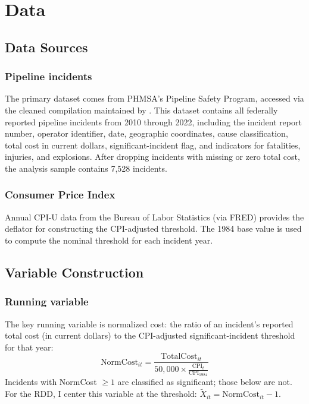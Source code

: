 \documentclass[12pt]{article}
\begin{document}
\section{Data}
\label{sec:data}

\subsection{Data Sources}

\subsubsection*{Pipeline incidents} The primary dataset comes from PHMSA's Pipeline Safety Program, accessed via the cleaned compilation maintained by \citet{mcEager2024phmsa}. This dataset contains all federally reported pipeline incidents from 2010 through 2022, including the incident report number, operator identifier, date, geographic coordinates, cause classification, total cost in current dollars, significant-incident flag, and indicators for fatalities, injuries, and explosions. After dropping incidents with missing or zero total cost, the analysis sample contains 7,528 incidents.

\subsubsection*{Consumer Price Index} Annual CPI-U data from the Bureau of Labor Statistics (via FRED) provides the deflator for constructing the CPI-adjusted threshold. The 1984 base value is used to compute the nominal threshold for each incident year.

\subsection{Variable Construction}

\subsubsection*{Running variable} The key running variable is normalized cost: the ratio of an incident's reported total cost (in current dollars) to the CPI-adjusted significant-incident threshold for that year:
\begin{equation}
\text{NormCost}_{it} = \frac{\text{TotalCost}_{it}}{50{,}000 \times \frac{\text{CPI}_t}{\text{CPI}_{1984}}}
\end{equation}
Incidents with NormCost $\geq 1$ are classified as significant; those below are not. For the RDD, I center this variable at the threshold: $\widetilde{X}_{it} = \text{NormCost}_{it} - 1$.
\end{document}
